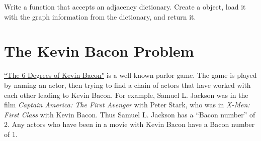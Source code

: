 \begin{problem}
Write a function that accepts an adjacency dictionary.
Create a  object, load it with the graph information from the dictionary, and return it.
\end{problem}

\section*{The Kevin Bacon Problem}

\href{http://oracleofbacon.org/help.php}{``The 6 Degrees of Kevin Bacon"} is a well-known parlor game.
The game is played by naming an actor, then trying to find a chain of actors that have worked with each other leading to Kevin Bacon.
For example, Samuel L. Jackson was in the film \emph{Captain America: The First Avenger} with Peter Stark, who was in \emph{X-Men: First Class} with Kevin Bacon.
Thus Samuel L. Jackson has a ``Bacon number'' of 2.
Any actors who have been in a movie with Kevin Bacon have a Bacon number of 1.

